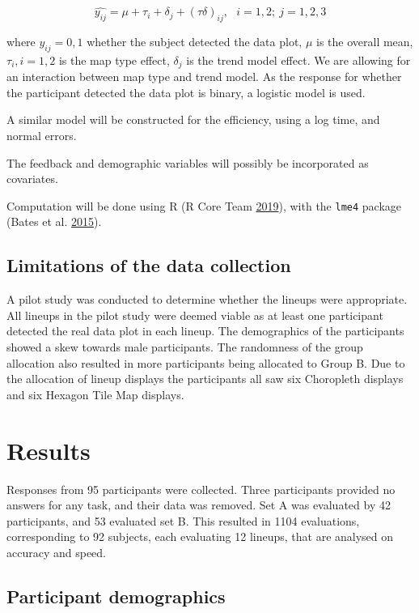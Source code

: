 \documentclass[conference,final,]{IEEEtran}
\begin{document}
\[\widehat{y_{ij}} = \mu + \tau_i + \delta_j + (\tau\delta)_{ij}, ~~~ i=1,2; ~j=1,2,3\]

where \(y_{ij} = 0, 1\) whether the subject detected the data plot,
\(\mu\) is the overall mean, \(\tau_i, i=1,2\) is the map type effect,
\(\delta_j\) is the trend model effect. We are allowing for an
interaction between map type and trend model. As the response for
whether the participant detected the data plot is binary, a logistic
model is used.

A similar model will be constructed for the efficiency, using a log
time, and normal errors.

The feedback and demographic variables will possibly be incorporated as
covariates.

Computation will be done using R (R Core Team
\protect\hyperlink{ref-RCore}{2019}), with the \texttt{lme4} package
(Bates et al. \protect\hyperlink{ref-lme4}{2015}).

\hypertarget{limitations-of-the-data-collection}{%
\subsection{Limitations of the data
collection}\label{limitations-of-the-data-collection}}

A pilot study was conducted to determine whether the lineups were
appropriate. All lineups in the pilot study were deemed viable as at
least one participant detected the real data plot in each lineup. The
demographics of the participants showed a skew towards male
participants. The randomness of the group allocation also resulted in
more participants being allocated to Group B. Due to the allocation of
lineup displays the participants all saw six Choropleth displays and six
Hexagon Tile Map displays.

\hypertarget{results}{%
\section{Results}\label{results}}

Responses from 95 participants were collected. Three participants
provided no answers for any task, and their data was removed. Set A was
evaluated by 42 participants, and 53 evaluated set B. This resulted in
1104 evaluations, corresponding to 92 subjects, each evaluating 12
lineups, that are analysed on accuracy and speed.

\hypertarget{participant-demographics}{%
\subsection{Participant demographics}\label{participant-demographics}}
\end{document}
